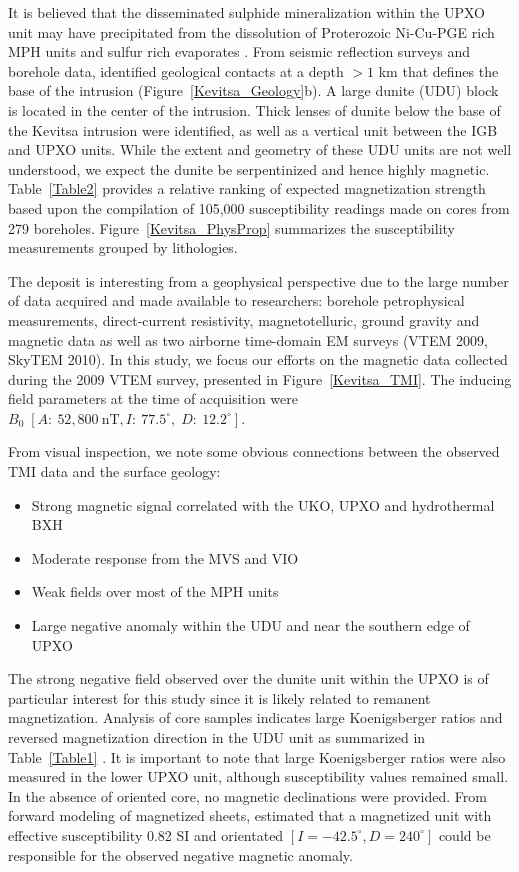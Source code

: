 \documentclass[paper]{geophysics}
\begin{document}
It is believed that the disseminated sulphide mineralization within the UPXO unit may have precipitated from the dissolution of Proterozoic Ni-Cu-PGE rich MPH units and sulfur rich evaporates \cite[]{Mutanen1997}. From seismic reflection surveys and borehole data, \cite{Koivisto2015} identified geological contacts at a depth $>1$ km that defines the base of the intrusion (Figure~\ref{Kevitsa_Geology}b).
A large dunite (UDU) block is located in the center of the intrusion. Thick lenses of dunite below the base of the Kevitsa intrusion were identified, as well as a vertical unit between the IGB and UPXO units. While the extent and geometry of these UDU units are not well understood, we expect the dunite be serpentinized and hence highly magnetic.
Table~\ref{Table2} provides a relative ranking of expected magnetization strength based upon the compilation of 105,000 susceptibility readings made on cores from 279 boreholes. Figure~\ref{Kevitsa_PhysProp} summarizes the susceptibility measurements grouped by lithologies.


The deposit is interesting from a geophysical perspective due to the large number of data acquired and made available to researchers: borehole petrophysical measurements, direct-current resistivity, magnetotelluric, ground gravity and magnetic data as well as two airborne time-domain EM surveys (VTEM 2009, SkyTEM 2010).
In this study, we focus our efforts on the magnetic data collected during the 2009 VTEM survey, presented in Figure~\ref{Kevitsa_TMI}. The inducing field parameters at the time of acquisition were $B_0\;[A:\:52,800\: \text{nT}, I:\:77.5^\circ, \;D:\:12.2^\circ]$.


From visual inspection, we note some obvious connections between the observed TMI data and the surface geology:
\begin{itemize}
\item Strong magnetic signal correlated with the UKO, UPXO and hydrothermal BXH
\item Moderate response from the MVS and VIO
\item Weak fields over most of the MPH units
\item Large negative anomaly within the UDU and near the southern edge of UPXO
\end{itemize}
The strong negative field observed over the dunite unit within the UPXO is of particular interest for this study since it is likely related to remanent magnetization.
Analysis of core samples indicates large Koenigsberger ratios and reversed magnetization direction in the UDU unit as summarized in Table~\ref{Table1} \cite[~p.~47]{Montonen2012}. It is important to note that large Koenigsberger ratios were also measured in the lower UPXO unit, although susceptibility values remained small. In the absence of oriented core, no magnetic declinations were provided. From forward modeling of magnetized sheets, \cite{Montonen2012} estimated that a magnetized unit with effective susceptibility 0.82 SI and orientated $[I=-42.5^\circ, D=240^\circ]$ could be responsible for the observed negative magnetic anomaly.
\end{document}
